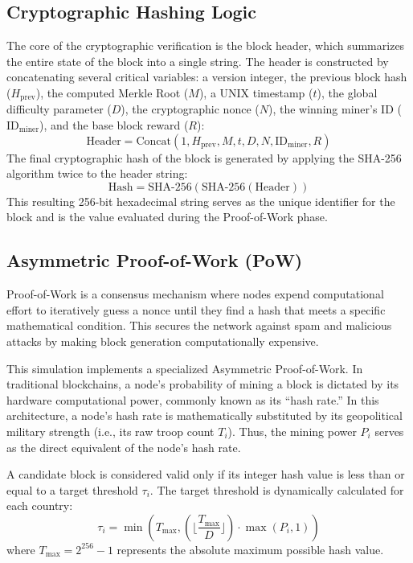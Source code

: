 \subsection{Cryptographic Hashing Logic}
The core of the cryptographic verification is the block header, which summarizes the entire state of the block into a single string. The header is constructed by concatenating several critical variables: a version integer, the previous block hash ($H_{\text{prev}}$), the computed Merkle Root ($M$), a UNIX timestamp ($t$), the global difficulty parameter ($D$), the cryptographic nonce ($N$), the winning miner's ID ($\text{ID}_{\text{miner}}$), and the base block reward ($R$):
\begin{equation}
\text{Header} = \text{Concat}\left(1, H_{\text{prev}}, M, t, D, N, \text{ID}_{\text{miner}}, R \right)
\end{equation}
The final cryptographic hash of the block is generated by applying the SHA-256 algorithm twice to the header string:
\begin{equation}
\text{Hash} = \text{SHA-256}\left(\text{SHA-256}\left( \text{Header} \right)\right)
\end{equation}
This resulting 256-bit hexadecimal string serves as the unique identifier for the block and is the value evaluated during the Proof-of-Work phase.

\subsection{Asymmetric Proof-of-Work (PoW)}
Proof-of-Work is a consensus mechanism where nodes expend computational effort to iteratively guess a nonce until they find a hash that meets a specific mathematical condition. This secures the network against spam and malicious attacks by making block generation computationally expensive.

This simulation implements a specialized Asymmetric Proof-of-Work. In traditional blockchains, a node's probability of mining a block is dictated by its hardware computational power, commonly known as its ``hash rate.'' In this architecture, a node's hash rate is mathematically substituted by its geopolitical military strength (i.e., its raw troop count $T_i$). Thus, the mining power $P_i$ serves as the direct equivalent of the node's hash rate. 

A candidate block is considered valid only if its integer hash value is less than or equal to a target threshold $\tau_i$. The target threshold is dynamically calculated for each country:
\begin{equation}
\tau_i = \min\left( T_{\max}, \left( \lfloor \frac{T_{\max}}{D} \rfloor \right) \cdot \max(P_i, 1) \right)
\end{equation}
where $T_{\max} = 2^{256} - 1$ represents the absolute maximum possible hash value. 

